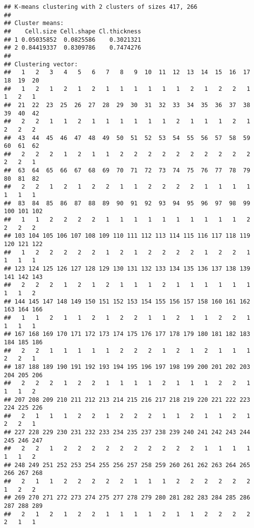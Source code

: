 \documentclass[]{article}
\begin{document}
\begin{verbatim}
## K-means clustering with 2 clusters of sizes 417, 266
## 
## Cluster means:
##    Cell.size Cell.shape Cl.thickness
## 1 0.05035852  0.0825586    0.3021321
## 2 0.84419337  0.8309786    0.7474276
## 
## Clustering vector:
##   1   2   3   4   5   6   7   8   9  10  11  12  13  14  15  16  17  18  19  20 
##   1   2   1   2   1   2   1   1   1   1   1   1   2   1   2   2   1   1   2   1 
##  21  22  23  25  26  27  28  29  30  31  32  33  34  35  36  37  38  39  40  42 
##   2   2   1   1   2   1   1   1   1   1   1   2   1   1   1   2   1   2   2   2 
##  43  44  45  46  47  48  49  50  51  52  53  54  55  56  57  58  59  60  61  62 
##   2   2   2   1   2   1   1   2   2   2   2   2   2   2   2   2   2   2   2   1 
##  63  64  65  66  67  68  69  70  71  72  73  74  75  76  77  78  79  80  81  82 
##   2   2   1   2   1   2   2   1   1   2   2   2   2   1   1   1   1   1   1   1 
##  83  84  85  86  87  88  89  90  91  92  93  94  95  96  97  98  99 100 101 102 
##   1   1   2   2   2   2   1   1   1   1   1   1   1   1   1   1   2   2   2   2 
## 103 104 105 106 107 108 109 110 111 112 113 114 115 116 117 118 119 120 121 122 
##   1   2   2   2   2   2   1   2   1   2   2   2   2   1   2   2   1   1   1   1 
## 123 124 125 126 127 128 129 130 131 132 133 134 135 136 137 138 139 141 142 143 
##   2   2   2   1   2   1   2   1   1   1   2   1   1   1   1   1   1   1   1   2 
## 144 145 147 148 149 150 151 152 153 154 155 156 157 158 160 161 162 163 164 166 
##   1   1   2   1   1   2   1   2   2   1   1   2   1   1   2   2   1   1   1   1 
## 167 168 169 170 171 172 173 174 175 176 177 178 179 180 181 182 183 184 185 186 
##   2   2   1   1   1   1   1   2   2   2   1   2   1   2   1   1   1   2   2   1 
## 187 188 189 190 191 192 193 194 195 196 197 198 199 200 201 202 203 204 205 206 
##   2   2   2   1   2   2   1   1   1   1   2   1   1   1   2   2   1   1   1   2 
## 207 208 209 210 211 212 213 214 215 216 217 218 219 220 221 222 223 224 225 226 
##   2   1   1   1   2   2   1   2   2   2   1   1   2   1   1   2   1   2   2   1 
## 227 228 229 230 231 232 233 234 235 237 238 239 240 241 242 243 244 245 246 247 
##   2   2   1   2   2   2   2   2   2   2   2   2   2   1   1   1   1   1   1   2 
## 248 249 251 252 253 254 255 256 257 258 259 260 261 262 263 264 265 266 267 268 
##   2   1   1   2   2   2   2   2   1   1   1   2   2   2   2   2   2   1   2   2 
## 269 270 271 272 273 274 275 277 278 279 280 281 282 283 284 285 286 287 288 289 
##   2   1   2   1   2   2   1   1   1   1   2   1   1   2   2   2   2   2   1   1 

\end{verbatim}
\end{document}
